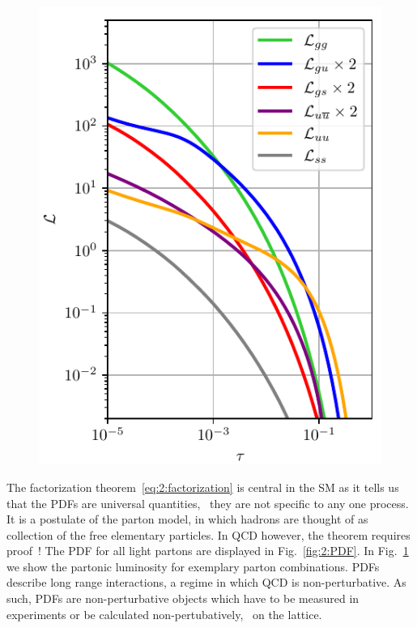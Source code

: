 \begin{figure}[h]
\begin{minipage}[t]{0.48\textwidth}
\includegraphics[width=\textwidth]{Images/luminosity.pdf}
\label{fig:2:luminosity}
\end{minipage}
\end{figure}

The factorization theorem~\eqref{eq:2:factorization} is central in the \acs{SM} as it tells us that the \acs{PDF}s are universal quantities, \ie\ they are not specific to any one process. It is a postulate of the parton model, in which hadrons are thought of as collection of the free elementary particles. In \acs{QCD} however, the theorem requires proof~\cite{Collins:1989gx}!
The \acs{PDF} for all light partons are displayed in Fig.~\ref{fig:2:PDF}. In Fig.~\ref{fig:2:luminosity} we show the partonic luminosity for exemplary parton combinations. \acs{PDF}s describe long range interactions, a regime in which \acs{QCD} is non-perturbative. As such, \acs{PDF}s are non-perturbative objects which have to be measured in experiments or be calculated non-pertubatively, \eg\ on the lattice.

